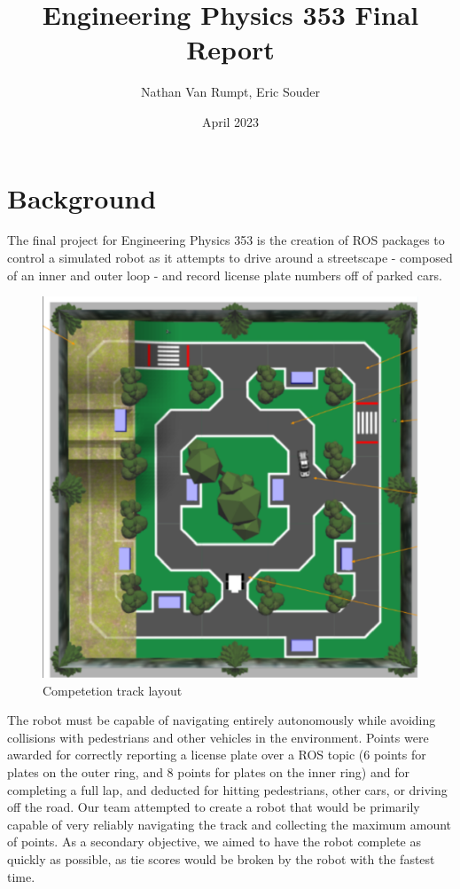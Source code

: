 \documentclass[titlepage, twocolumn]{article}
\newcommand{\subtitle}[1]{%
  \posttitle{%
    \par\end{center}
    \begin{center}\large#1\end{center}
    \vskip0.5em}%
}
\begin{document}
\title{Engineering Physics 353 Final Report}
\subtitle{Team 15}
\author{Nathan Van Rumpt, Eric Souder}
\date{April 2023}

\maketitle

\section{Background}

    The final project for Engineering Physics 353 is the creation of ROS packages to control a simulated robot as it attempts to drive around a streetscape - composed of an inner and outer loop - and record license plate numbers off of parked cars. 
    
    \begin{figure}[H]
    \centering
    \includegraphics[width=\linewidth]{Competition Space.png}
    \caption{Competetion track layout}
    \label{fig:label}
    \end{figure}
    
    The robot must be capable of navigating entirely autonomously while avoiding collisions with pedestrians and other vehicles in the environment. Points were awarded for correctly reporting a license plate over a ROS topic (6 points for plates on the outer ring, and 8 points for plates on the inner ring) and for completing a full lap, and deducted for hitting pedestrians, other cars, or driving off the road. Our team attempted to create a robot that would be primarily capable of very reliably navigating the track and collecting the maximum amount of points. As a secondary objective, we aimed to have the robot complete as quickly as possible, as tie scores would be broken by the robot with the fastest time.
\end{document}
